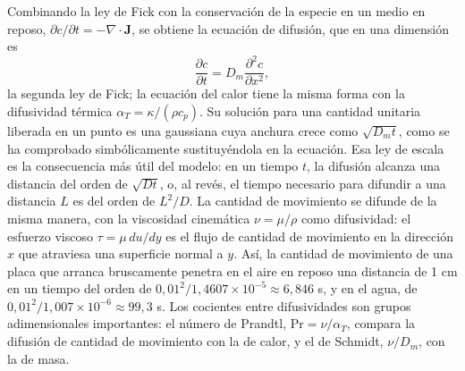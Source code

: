 \documentclass[10pt,openany]{book}
\begin{document}
\begin{minipage}{\linewidth}
%
\fi
\fi
\endgroup
\par\nopagebreak
{}
\end{minipage}
\par\vspace{\baselineskip}

Combinando la ley de Fick con la conservación de la especie en un medio en reposo, \(\partial c/\partial t = -\nabla\cdot\mathbf{J}\), se obtiene la ecuación de difusión, que en una dimensión es
\begin{equation}
\frac{\partial c}{\partial t} = D_m\frac{\partial^{2}c}{\partial x^{2}}, \label{eq:c13-difusion}
\end{equation}
la segunda ley de Fick; la ecuación del calor tiene la misma forma con la difusividad térmica \(\alpha_T = \kappa/(\rho c_p)\). Su solución para una cantidad unitaria liberada en un punto es una gaussiana cuya anchura crece como \(\sqrt{D_m t}\), como se ha comprobado simbólicamente sustituyéndola en la ecuación. Esa ley de escala es la consecuencia más útil del modelo: en un tiempo \(t\), la difusión alcanza una distancia del orden de \(\sqrt{Dt}\), o, al revés, el tiempo necesario para difundir a una distancia \(L\) es del orden de \(L^{2}/D\). La cantidad de movimiento se difunde de la misma manera, con la viscosidad cinemática \(\nu = \mu/\rho\) como difusividad: el esfuerzo viscoso \(\tau = \mu\,du/dy\) es el flujo de cantidad de movimiento en la dirección \(x\) que atraviesa una superficie normal a \(y\). Así, la cantidad de movimiento de una placa que arranca bruscamente penetra en el aire en reposo una distancia de 1 cm en un tiempo del orden de \(0{,}01^{2}/1{,}4607\times 10^{-5} \approx 6{,}846\) s, y en el agua, de \(0{,}01^{2}/1{,}007\times 10^{-6} \approx 99{,}3\) s. Los cocientes entre difusividades son grupos adimensionales importantes: el número de Prandtl, \(\mathrm{Pr} = \nu/\alpha_T\), compara la difusión de cantidad de movimiento con la de calor, y el de Schmidt, \(\nu/D_m\), con la de masa.
\end{document}
